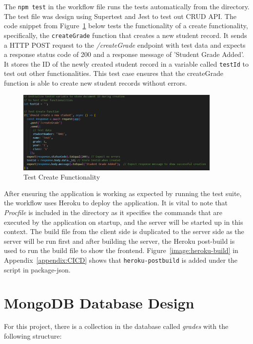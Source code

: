 The \texttt{npm test} in the workflow file runs the tests automatically from the directory. The test file was design using Supertest and Jest to test out CRUD API. The code snippet from Figure~\ref{image:test-create} below tests the functionality of a create functionality, specifically, the \texttt{createGrade} function that creates a new student record. It sends a HTTP POST request to the \textit{/createGrade} endpoint with test data and expects a response status code of 200 and a response message of 'Student Grade Added'. It stores the ID of the newly created student record in a variable called \texttt{testId} to test out other functionalities. This test case ensures that the createGrade function is able to create new student records without errors.

\begin{figure}[h!]
    \centering
    \includegraphics[width=0.9\textwidth]{images/test-create.png}
    \caption{Test Create Functionality}
    \label{image:test-create}
\end{figure}

After ensuring the application is working as expected by running the test suite, the workflow uses Heroku to deploy the application. It is vital to note that \textit{Procfile} is included in the directory as it specifies the commands that are executed by the application on startup, and the server will be started up in this context. The build file from the client side is duplicated to the server side as the server will be run first and after building the server, the Heroku post-build is used to run the build file to show the frontend. Figure~\ref{image:heroku-build} in Appendix~\ref{appendix:CICD} shows that \texttt{heroku-postbuild} is added under the script in package-json.

\section{MongoDB Database Design}

For this project, there is a collection in the database called \textit{grades} with the following structure:

